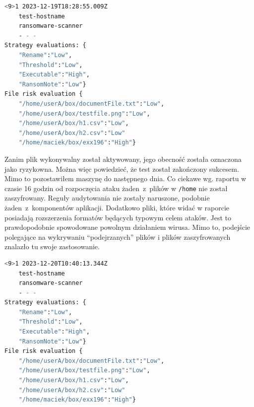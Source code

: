 \begin{lstlisting}[language=bash,
    backgroundcolor=\color{EEGold!5!white},
    caption={Pierwszy raport~z~ataku Ransom EXX.},
    label={lst:raportau}]
    <9>1 2023-12-19T18:28:55.009Z
    test-hostname 
    ransomware-scanner 
    - - -  
Strategy evaluations: {
    "Rename":"Low",
    "Threshold":"Low",
    "Executable":"High",
    "RansomNote":"Low"}
File risk evaluation {
    "/home/userA/box/documentFile.txt":"Low",
    "/home/userA/box/testfile.png":"Low",
    "/home/userA/box/h1.csv":"Low",
    "/home/userA/box/h2.csv":"Low"
    "/home/maciek/box/exx196":"High"}
\end{lstlisting}
Zanim plik wykonywalny został aktywowany, jego obecność została oznaczona jako ryzykowna. Można więc powiedzieć, że test został zakończony sukcesem. Mimo to pozostawiłem maszynę do następnego dnia. Co ciekawe wg. raportu w czasie 16 godzin od rozpoczęcia ataku żaden~z~plików w \texttt{/home} nie został zaszyfrowany.
Reguły audytowania nie zostały naruszone, podobnie żaden~z~komponentów aplikacji. Dodatkowo pliki, które widać w raporcie posiadają rozszerzenia formatów będących typowym celem ataków. Jest to prawdopodobnie spowodowane powolnym działaniem wirusa.  Mimo to, podejście polegające na wykrywaniu \enquote{podejrzanych} plików i plików zaszyfrowanych znalazło tu swoje zastosowanie.
\begin{lstlisting}[language=bash,
    backgroundcolor=\color{EEGold!5!white},
    caption={Drugi raport~z~ataku Ransom EXX.},
    label={lst:raportau}]
    <9>1 2023-12-20T10:40:13.344Z
    test-hostname 
    ransomware-scanner 
    - - -  
Strategy evaluations: {
    "Rename":"Low",
    "Threshold":"Low",
    "Executable":"High",
    "RansomNote":"Low"}
File risk evaluation {
    "/home/userA/box/documentFile.txt":"Low",
    "/home/userA/box/testfile.png":"Low",
    "/home/userA/box/h1.csv":"Low",
    "/home/userA/box/h2.csv":"Low"
    "/home/maciek/box/exx196":"High"}
\end{lstlisting}
%
%
